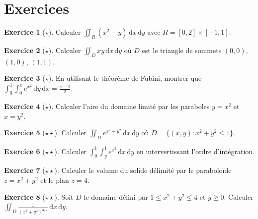 \documentclass[12pt,a4paper,openany]{book}
\theoremstyle{definition}
\newtheorem{exercice}{Exercice}[chapter]
\newcommand{\dd}{\mathrm{d}}
\begin{document}

\section{Exercices}
\label{sec:exercices-chap10}

\begin{exercice}[$\star$]
  Calculer $\displaystyle\iint_R (x^2 - y)\,\dd x\,\dd y$ avec
  $R = [0,2]\times[-1,1]$.
\end{exercice}

\begin{exercice}[$\star$]
  Calculer $\displaystyle\iint_D xy\,\dd x\,\dd y$ où $D$ est le
  triangle de sommets $(0,0)$, $(1,0)$, $(1,1)$.
\end{exercice}

\begin{exercice}[$\star$]
  En utilisant le théorème de Fubini, montrer que
  $\displaystyle\int_0^1\!\int_0^x e^{x^2}\,\dd y\,\dd x
  = \frac{e-1}{2}$.
\end{exercice}

\begin{exercice}[$\star$]
  Calculer l'aire du domaine limité par les paraboles $y = x^2$ et
  $x = y^2$.
\end{exercice}

\begin{exercice}[$\star\star$]
  Calculer $\displaystyle\iint_D e^{x^2+y^2}\,\dd x\,\dd y$ où
  $D = \{(x,y) : x^2 + y^2 \leqslant 1\}$.
\end{exercice}

\begin{exercice}[$\star\star$]
  Calculer $\displaystyle\int_0^1\!\int_y^1 e^{x^2}\,\dd x\,\dd y$
  en intervertissant l'ordre d'intégration.
\end{exercice}

\begin{exercice}[$\star\star$]
  Calculer le volume du solide délimité par le paraboloïde
  $z = x^2 + y^2$ et le plan $z = 4$.
\end{exercice}

\begin{exercice}[$\star\star$]
  Soit $D$ le domaine défini par $1 \leqslant x^2 + y^2 \leqslant 4$
  et $y \geqslant 0$. Calculer $\displaystyle\iint_D \frac{1}
  {(x^2+y^2)^{3/2}}\,\dd x\,\dd y$.
\end{exercice}
\end{document}
